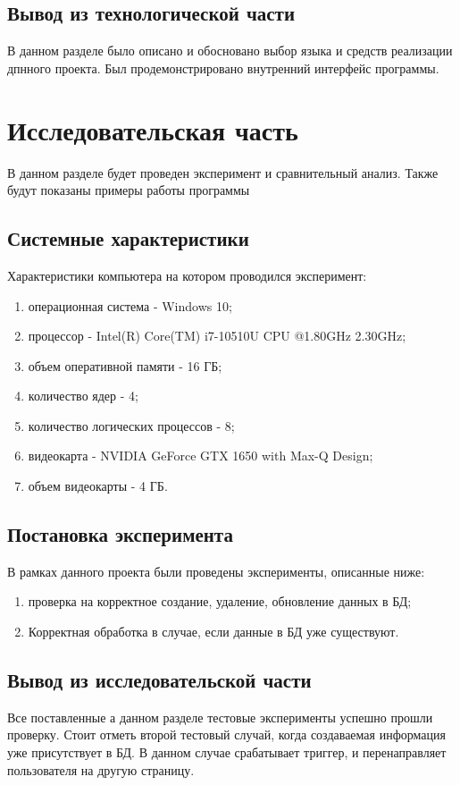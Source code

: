 \documentclass[a4paper, 10pt]{article}
\begin{document}
	\subsection{Вывод из технологической части}
	\hspace*{5mm} В данном разделе было описано и обосновано выбор языка и средств реализации дпнного проекта.  Был продемонстрировано внутренний интерфейс программы.

\newpage
\section{Исследовательская часть }
	\hspace*{5mm} В данном разделе будет проведен эксперимент и сравнительный анализ. Также будут показаны примеры работы программы
	\subsection{Системные характеристики}
	Характеристики компьютера на котором проводился эксперимент:
	\begin{enumerate}
		\item операционная система - Windows 10;
		\item процессор - Intel(R) Core(TM) i7-10510U CPU @1.80GHz 2.30GHz;
		\item объем оперативной памяти - 16 ГБ;
		\item количество ядер - 4;
		\item количество логических процессов - 8;
		\item видеокарта - NVIDIA GeForce GTX 1650 with Max-Q Design;
		\item объем видеокарты - 4 ГБ.
	\end{enumerate}
	\subsection{Постановка эксперимента}
	В рамках данного проекта были проведены эксперименты, описанные ниже:
	\begin{enumerate}
		\item проверка на корректное создание, удаление, обновление данных в БД;
		\item Корректная обработка в случае, если данные в БД уже существуют.
	\end{enumerate}
	\subsection{Вывод из исследовательской части}
	\hspace*{5mm} Все поставленные а данном разделе тестовые эксперименты успешно прошли проверку. Стоит отметь второй тестовый случай, когда создаваемая информация уже присутствует в БД. В данном случае срабатывает триггер, и перенаправляет пользователя на другую страницу.
	\clearpage
\end{document}
